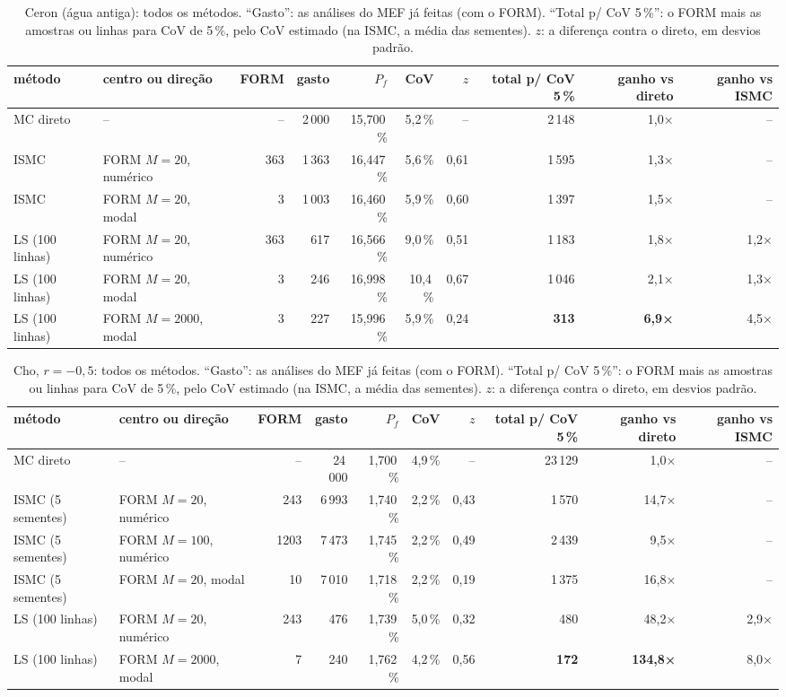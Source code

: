 \begin{landscape}
\begin{table}[H]\centering\small
\caption{Ceron (água antiga): todos os métodos. ``Gasto'': as análises do MEF já feitas (com o FORM). ``Total p/ CoV 5\,\%'': o FORM mais as amostras ou linhas para CoV de 5\,\%, pelo CoV estimado (na ISMC, a média das sementes). $z$: a diferença contra o direto, em desvios padrão.}\label{tab:ceron}
\begin{tabular}{llrrrrrrrr}\toprule
método & centro ou direção & FORM & gasto & $P_f$ & CoV & $z$ & total p/ CoV 5\,\% & ganho vs direto & ganho vs ISMC \\\midrule
MC direto & -- & -- & 2\,000 & 15,700\,\% & 5,2\,\% & -- & 2\,148 & 1,0× & -- \\
ISMC & FORM $M = 20$, numérico & 363 & 1\,363 & 16,447\,\% & 5,6\,\% & 0,61 & 1\,595 & 1,3× & -- \\
ISMC & FORM $M = 20$, modal & 3 & 1\,003 & 16,460\,\% & 5,9\,\% & 0,60 & 1\,397 & 1,5× & -- \\
LS (100 linhas) & FORM $M = 20$, numérico & 363 & 617 & 16,566\,\% & 9,0\,\% & 0,51 & 1\,183 & 1,8× & 1,2× \\
LS (100 linhas) & FORM $M = 20$, modal & 3 & 246 & 16,998\,\% & 10,4\,\% & 0,67 & 1\,046 & 2,1× & 1,3× \\
LS (100 linhas) & FORM $M = 2000$, modal & 3 & 227 & 15,996\,\% & 5,9\,\% & 0,24 & \textbf{313} & \textbf{6,9×} & 4,5× \\
\bottomrule\end{tabular}\end{table}

\begin{table}[H]\centering\small
\caption{Cho, $r = -0{,}5$: todos os métodos. ``Gasto'': as análises do MEF já feitas (com o FORM). ``Total p/ CoV 5\,\%'': o FORM mais as amostras ou linhas para CoV de 5\,\%, pelo CoV estimado (na ISMC, a média das sementes). $z$: a diferença contra o direto, em desvios padrão.}\label{tab:r05}
\begin{tabular}{llrrrrrrrr}\toprule
método & centro ou direção & FORM & gasto & $P_f$ & CoV & $z$ & total p/ CoV 5\,\% & ganho vs direto & ganho vs ISMC \\\midrule
MC direto & -- & -- & 24\,000 & 1,700\,\% & 4,9\,\% & -- & 23\,129 & 1,0× & -- \\
ISMC (5 sementes) & FORM $M = 20$, numérico & 243 & 6\,993 & 1,740\,\% & 2,2\,\% & 0,43 & 1\,570 & 14,7× & -- \\
ISMC (5 sementes) & FORM $M = 100$, numérico & 1203 & 7\,473 & 1,745\,\% & 2,2\,\% & 0,49 & 2\,439 & 9,5× & -- \\
ISMC (5 sementes) & FORM $M = 20$, modal & 10 & 7\,010 & 1,718\,\% & 2,2\,\% & 0,19 & 1\,375 & 16,8× & -- \\
LS (100 linhas) & FORM $M = 20$, numérico & 243 & 476 & 1,739\,\% & 5,0\,\% & 0,32 & 480 & 48,2× & 2,9× \\
LS (100 linhas) & FORM $M = 2000$, modal & 7 & 240 & 1,762\,\% & 4,2\,\% & 0,56 & \textbf{172} & \textbf{134,8×} & 8,0× \\
\bottomrule\end{tabular}\end{table}


\end{landscape}
